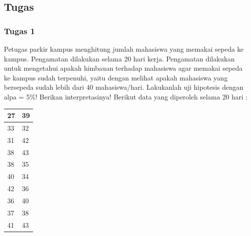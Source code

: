 \documentclass[a4paper,12pt]{article}
\begin{document}
\subsection{Tugas}
\subsubsection{Tugas 1}
Petugas parkir kampus menghitung jumlah mahasiswa yang memakai sepeda ke kampus. Pengamatan dilakukan selama 20 hari kerja. Pengamatan dilakukan untuk mengetahui apakah himbauan terhadap mahasiswa agar memakai sepeda ke kampus sudah terpenuhi, yaitu dengan melihat apakah mahasiswa yang bersepeda sudah lebih dari 40 mahasiswa/hari. Lakukanlah uji hipotesis dengan alpa = 5\%! Berikan interpretasinya! Berikut data yang diperoleh selama 20 hari :
\begin{table}[!ht]
    \centering
    \begin{tabular}{|l|l|}
        \hline
        27 & 39 \\ \hline
        33 & 32 \\ \hline
        31 & 42 \\ \hline
        38 & 43 \\ \hline
        38 & 35 \\ \hline
        40 & 34 \\ \hline
        42 & 36 \\ \hline
        36 & 40 \\ \hline
        37 & 38 \\ \hline
        41 & 43 \\ \hline
    \end{tabular}
\end{table}
\end{document}
